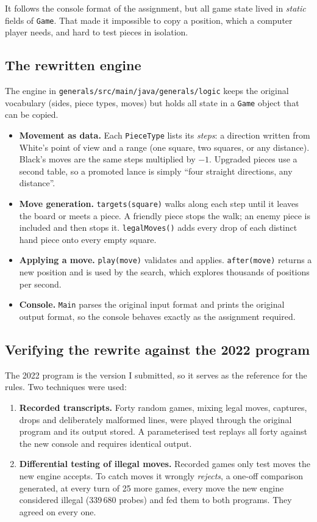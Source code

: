 \documentclass[11pt,a4paper]{article}
\begin{document}
It follows the console format of the assignment, but all game state lived in \emph{static} fields of \texttt{Game}. That made it impossible to copy a position, which a computer player needs, and hard to test pieces in isolation.

\subsection{The rewritten engine}

The engine in \texttt{generals/src/main/java/generals/logic} keeps the original vocabulary (sides, piece types, moves) but holds all state in a \texttt{Game} object that can be copied.

\begin{itemize}
\item \textbf{Movement as data.} Each \texttt{PieceType} lists its \emph{steps}: a direction written from White's point of view and a range (one square, two squares, or any distance). Black's moves are the same steps multiplied by $-1$. Upgraded pieces use a second table, so a promoted lance is simply ``four straight directions, any distance''.
\item \textbf{Move generation.} \texttt{targets(square)} walks along each step until it leaves the board or meets a piece. A friendly piece stops the walk; an enemy piece is included and then stops it. \texttt{legalMoves()} adds every drop of each distinct hand piece onto every empty square.
\item \textbf{Applying a move.} \texttt{play(move)} validates and applies. \texttt{after(move)} returns a new position and is used by the search, which explores thousands of positions per second.
\item \textbf{Console.} \texttt{Main} parses the original input format and prints the original output format, so the console behaves exactly as the assignment required.
\end{itemize}

\subsection{Verifying the rewrite against the 2022 program}

The 2022 program is the version I submitted, so it serves as the reference for the rules. Two techniques were used:

\begin{enumerate}
\item \textbf{Recorded transcripts.} Forty random games, mixing legal moves, captures, drops and deliberately malformed lines, were played through the original program and its output stored. A parameterised test replays all forty against the new console and requires identical output.
\item \textbf{Differential testing of illegal moves.} Recorded games only test moves the new engine accepts. To catch moves it wrongly \emph{rejects}, a one-off comparison generated, at every turn of 25 more games, every move the new engine considered illegal (339\,680 probes) and fed them to both programs. They agreed on every one.
\end{enumerate}
\end{document}
